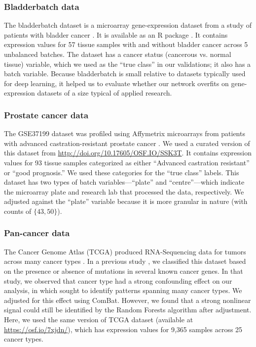 \subsubsection{Bladderbatch data}

The bladderbatch dataset is a microarray gene-expression dataset from a study of patients with bladder cancer \cite{dyrskjot_gene_2004}.
It is available as an R package \cite{leek_bladderbatch_2017}.
It contains expression values for 57 tissue samples with and without bladder cancer across 5 unbalanced batches.
The dataset has a cancer status (cancerous vs. normal tissue) variable, which we used as the ``true class'' in our validations; it also has a batch variable.
Because bladderbatch is small relative to datasets typically used for deep learning, it helped us to evaluate whether our network overfits on gene-expression datasets of a size typical of applied research.

\subsubsection{Prostate cancer data}

The GSE37199 dataset was profiled using Affymetrix microarrays from patients with advanced castration-resistant prostate cancer \cite{olmos_prognostic_2012}.
We used a curated version of this dataset from \url{http://doi.org/10.17605/OSF.IO/SSK3T}\cite{golightly_curated_2018}.
It contains expression values for 93 tissue samples categorized as either ``Advanced castration resistant'' or ``good prognosis.''
We used these categories for the ``true class'' labels.
This dataset has two types of batch variables---``plate'' and ``centre''---which indicate the microarray plate and research lab that processed the data, respectively.
We adjusted against the ``plate'' variable because it is more granular in nature (with counts of $\{43, 50\}$).

\subsubsection{Pan-cancer data}

The Cancer Genome Atlas (TCGA) produced RNA-Sequencing data for tumors across many cancer types \cite{the_cancer_genome_atlas_research_network_cancer_2013}.
In a previous study \cite{dayton_classifying_2017-1}, we classified this dataset based on the presence or absence of mutations in several known cancer genes.
In that study, we observed that cancer type had a strong confounding effect on our analysis, in which sought to identify patterns spanning many cancer types. We adjusted for this effect using ComBat.
However, we found that a strong nonlinear signal could still be identified by the Random Forests algorithm after adjustment.
Here, we used the same version of TCGA dataset (available at \url{https://osf.io/7xjdn/}),
which has expression values for 9,365 samples across 25 cancer types.

